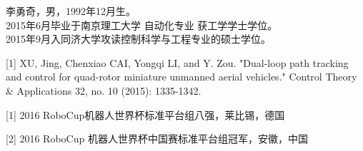 \begin{resume}

\hskip-0.81cm 李勇奇，男，1992年12月生。
\\
2015年6月毕业于南京理工大学 自动化专业 获工学学士学位。
\\
2015年9月入同济大学攻读控制科学与工程专业的硕士学位。

\hskip-0.81cm [1] XU, Jing, Chenxiao CAI, Yongqi LI, and Y. Zou. "Dual-loop path tracking and control for quad-rotor miniature unmanned aerial vehicles." Control Theory \& Applications 32, no. 10 (2015): 1335-1342.


\hskip-0.81cm [1] 2016 RoboCup机器人世界杯标准平台组八强，莱比锡，德国

\hskip-0.81cm [2] 2016 RoboCup 机器人世界杯中国赛标准平台组冠军，安徽，中国


\end{resume}

